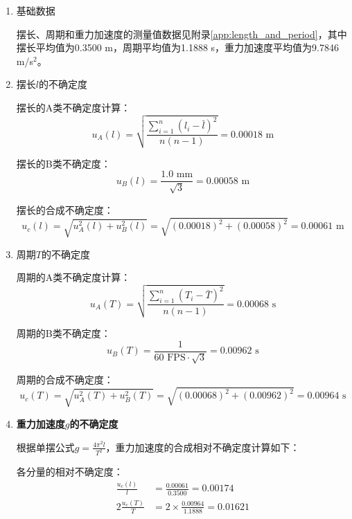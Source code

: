 \begin{enumerate}[leftmargin=*]
\item 基础数据

摆长、周期和重力加速度的测量值数据见附录\ref{app:length_and_period}，其中摆长平均值为0.3500 m，周期平均值为1.1888 s，重力加速度平均值为9.7846 m/s$^2$。

\item 摆长$l$的不确定度

摆长的A类不确定度计算：
\begin{equation}
u_A(l) = \sqrt{\frac{\sum_{i=1}^{n}(l_i-\bar{l})^2}{n(n-1)}} = 0.00018\text{ m}
\end{equation}

摆长的B类不确定度：
\begin{equation}
u_B(l) = \frac{1.0\text{ mm}}{\sqrt{3}} = 0.00058\text{ m}
\end{equation}

摆长的合成不确定度：
\begin{equation}
u_c(l) = \sqrt{u_A^2(l) + u_B^2(l)} = \sqrt{(0.00018)^2 + (0.00058)^2} = 0.00061\text{ m}
\end{equation}

\item 周期$T$的不确定度

周期的A类不确定度计算：
\begin{equation}
u_A(T) = \sqrt{\frac{\sum_{i=1}^{n}(T_i-\bar{T})^2}{n(n-1)}} = 0.00068\text{ s}
\end{equation}

周期的B类不确定度：
\begin{equation}
u_B(T) = \frac{1}{60\text{ FPS}\cdot\sqrt{3}} = 0.00962\text{ s}
\end{equation}

周期的合成不确定度：
\begin{equation}
u_c(T) = \sqrt{u_A^2(T) + u_B^2(T)} = \sqrt{(0.00068)^2 + (0.00962)^2} = 0.00964\text{ s}
\end{equation}

\item \textbf{重力加速度$g$的不确定度}

根据单摆公式$g = \frac{4\pi^2l}{T^2}$，重力加速度的合成相对不确定度计算如下：

各分量的相对不确定度：
\begin{align}
\frac{u_c(l)}{l} &= \frac{0.00061}{0.3500} = 0.00174 \\
2\frac{u_c(T)}{T} &= 2 \times \frac{0.00964}{1.1888} = 0.01621
\end{align}


\end{enumerate}
